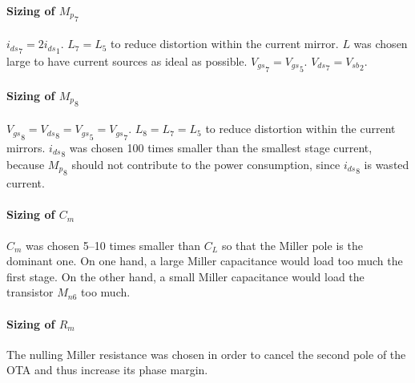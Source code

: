 \documentclass[english,11pt]{article}
\begin{document}
\paragraph{Sizing of ${M_{p}}_7$}
${i_{ds}}_7 = 2 {i_{ds}}_1$.
$L_7 = L_5$ to reduce distortion within the current mirror. $L$ was chosen large to have current sources as ideal as possible.
${V_{gs}}_7 = {V_{gs}}_5$.
${V_{ds}}_7 = {V_{sb}}_2$.

\paragraph{Sizing of ${M_{p}}_8$}
${V_{gs}}_8 = {V_{ds}}_8 = {V_{gs}}_5 = {V_{gs}}_7$.
$L_8 = L_7 = L_5$ to reduce distortion within the current mirrors.
${i_{ds}}_8$ was chosen 100 times smaller than the smallest stage current, because ${M_{p}}_8$ should not contribute to the power consumption, since ${i_{ds}}_8$ is wasted current.

\paragraph{Sizing of $C_{m}$}
$C_{m}$ was chosen 5--10 times smaller than $C_L$ so that the Miller pole is the dominant one. On one hand, a large Miller capacitance would load too much the first stage. On the other hand, a small Miller capacitance would load the transistor $M_{n6}$ too much.

\paragraph{Sizing of $R_{m}$}
The nulling Miller resistance was chosen in order to cancel the second pole of the OTA and thus increase its phase margin.
\end{document}
